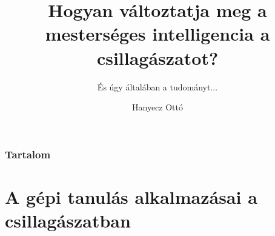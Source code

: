 \documentclass{beamer}
\title[MI a csillagászatban]{Hogyan változtatja meg a mesterséges intelligencia a csillagászatot?}
\subtitle{És úgy általában a tudományt...}
\author{Hanyecz Ottó}
\date[MTT, \today]
{
\begin{columns}
    \begin{column}{0.9\textwidth}
        \centering
        \begin{Large}
            Polaris Csillagvizsgáló \\
        \end{Large}
        \vspace*{0.5cm}
        Budapest \\
        \vspace*{0.5cm}
        2020. október 27.
    \end{column}
\end{columns}
}
\begin{document}
\begin{frame}
    \titlepage
\end{frame}

\begin{frame}
    \frametitle{Tartalom}
    \tableofcontents
\end{frame}



\section{A gépi tanulás alkalmazásai a csillagászatban}




\end{document}
